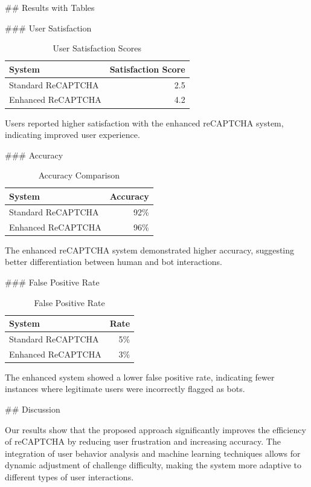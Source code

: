 ## Results with Tables

### User Satisfaction

\begin{table}[h]
\centering
\caption{User Satisfaction Scores}
\label{tab:user_satisfaction}
\begin{tabular}{|l|r|}
\hline
\textbf{System} & \textbf{Satisfaction Score} \\ \hline
Standard ReCAPTCHA & 2.5 \\
Enhanced ReCAPTCHA & 4.2 \\ \hline
\end{tabular}
\end{table}

Users reported higher satisfaction with the enhanced reCAPTCHA system, indicating improved user experience.

### Accuracy

\begin{table}[h]
\centering
\caption{Accuracy Comparison}
\label{tab:accuracy}
\begin{tabular}{|l|r|}
\hline
\textbf{System} & \textbf{Accuracy} \\ \hline
Standard ReCAPTCHA & 92\% \\
Enhanced ReCAPTCHA & 96\% \\ \hline
\end{tabular}
\end{table}

The enhanced reCAPTCHA system demonstrated higher accuracy, suggesting better differentiation between human and bot interactions.

### False Positive Rate

\begin{table}[h]
\centering
\caption{False Positive Rate}
\label{tab:false_positive}
\begin{tabular}{|l|r|}
\hline
\textbf{System} & \textbf{Rate} \\ \hline
Standard ReCAPTCHA & 5\% \\
Enhanced ReCAPTCHA & 3\% \\ \hline
\end{tabular}
\end{table}

The enhanced system showed a lower false positive rate, indicating fewer instances where legitimate users were incorrectly flagged as bots.

## Discussion

Our results show that the proposed approach significantly improves the efficiency of reCAPTCHA by reducing user frustration and increasing accuracy. The integration of user behavior analysis and machine learning techniques allows for dynamic adjustment of challenge difficulty, making the system more adaptive to different types of user interactions.

